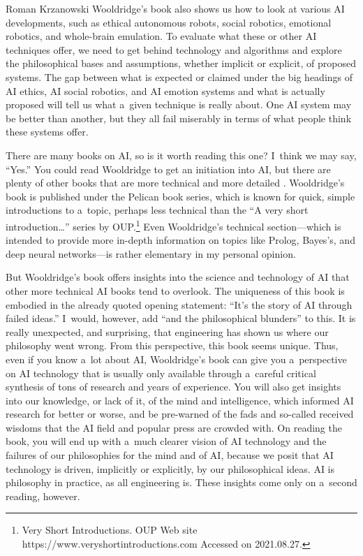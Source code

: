 \begin{newrevengenv}{Roman Krzanowski}
Wooldridge’s book also shows us how to look at various AI developments, such as ethical autonomous robots, social robotics, emotional robotics, and whole-brain emulation. To evaluate what these or other AI techniques offer, we need to get behind technology and algorithms and explore the philosophical bases and assumptions, whether implicit or explicit, of proposed systems. The gap between what is expected or claimed under the big headings of AI ethics, AI social robotics, and AI emotion systems and what is actually proposed will tell us what a~given technique is really about. One AI system may be better than another, but they all fail miserably in terms of what people think these systems offer.

There are many books on AI, so is it worth reading this one? I~think we may say, ``Yes.'' You could read Wooldridge to get an initiation into AI, but there are plenty of other books that are more technical and more detailed
\parencite[see e.g.][]{russell_artificial_2020}.
Wooldridge’s book is published under the Pelican book series, which is known for quick, simple introductions to a~topic, perhaps less technical than the ``A very short introduction…'' series by OUP.\footnote{Very Short Introductions. OUP Web site https://www.veryshortintroductions.com Accessed on 2021.08.27.} Even Wooldridge’s technical section—which is intended to provide more in-depth information on topics like Prolog, Bayes’s, and deep neural networks—is rather elementary in my personal opinion.

But Wooldridge’s book offers insights into the science and technology of AI that other more technical AI books tend to overlook. The uniqueness of this book is embodied in the already quoted opening statement: ``It’s the story of AI through failed ideas.'' I~would, however, add ``and the philosophical blunders'' to this. It is really unexpected, and surprising, that engineering has shown us where our philosophy went wrong. From this perspective, this book seems unique. Thus, even if you know a~lot about AI, Wooldridge’s book can give you a~perspective on AI technology that is usually only available through a~careful critical synthesis of tons of research and years of experience. You will also get insights into our knowledge, or lack of it, of the mind and intelligence, which informed AI research for better or worse, and be pre-warned of the fads and so-called received wisdoms that the AI field and popular press are crowded with. On reading the book, you will end up with a~much clearer vision of AI technology and the failures of our philosophies for the mind and of AI, because we posit that AI technology is driven, implicitly or explicitly, by our philosophical ideas. AI is philosophy in practice, as all engineering is. These insights come only on a~second reading, however.


\end{newrevengenv}
